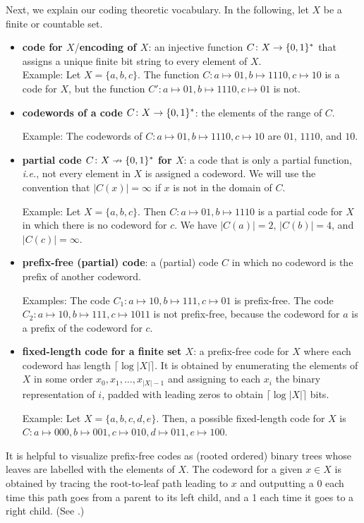 \documentclass[format=acmsmall, review=false, screen=true]{acmart}
\begin{document}
Next, we explain our coding theoretic vocabulary. In
the following, let $X$ be a finite or countable set.
\begin{itemize}
\item \textbf{code for $X$}/\textbf{encoding of $X$}: an 
injective function $C \colon X \to \{0, 1\}^*$ that
assigns a unique finite bit string to every element of $X$.\\
Example: Let $X = \{a,b,c\}$.
The function $C: a \mapsto 01, b \mapsto 1110, c \mapsto 10$ is
a code for $X$, but the function 
$C': a \mapsto 01, b \mapsto 1110, c \mapsto 01$ is not.
\item \textbf{codewords of a code $C\colon X \to \{0, 1\}^*$}:
the elements of the range of $C$.

Example: The codewords of
$C: a \mapsto 01, b \mapsto 1110, c \mapsto 10$ are
$01$, $1110$, and $10$.
\item \textbf{partial code $C\colon X\nrightarrow \{0,1\}^*$ for $X$}: a 
code that is only a partial function, \emph{i.e.}, not every element
in $X$ is assigned a codeword.
We will use the convention that
$|C(x)|=\infty$ if $x$ is not in the domain of $C$.

Example:
Let $X = \{a,b,c\}$.
Then $C: a \mapsto 01, b \mapsto 1110$ is
a partial code for $X$ in which there is no codeword for $c$.
We have $|C(a)| = 2$, $|C(b)| = 4$, and $|C(c)| = \infty$.
\item \textbf{prefix-free (partial) code}: a 
(partial) code $C$ in which no codeword is the prefix
of another codeword.

Examples: The code $C_1: a \mapsto 10, b\mapsto 111, c \mapsto 01$
is prefix-free. The code $C_2: a \mapsto 10, b\mapsto 111, c \mapsto 1011$
is not prefix-free, because the codeword for $a$ is a prefix
of the codeword for $c$.
\item \textbf{fixed-length code for a finite set $X$}: 
a prefix-free code for $X$ where each codeword has
length $\lceil\log |X|\rceil$.
It is obtained by enumerating
the elements of $X$ in some order $x_0,x_1,\ldots,x_{|X|-1}$ and
assigning to each $x_i$ the binary 
representation of $i$, padded with
leading zeros to obtain $\lceil\log |X|\rceil$ bits.

Example: Let $X = \{a,b,c,d,e\}$. Then, a possible
fixed-length code for $X$ is
$C: a \mapsto 000, b \mapsto 001, c \mapsto 010, d \mapsto 011,
e \mapsto 100$.
\end{itemize}

It is helpful to visualize prefix-free
codes as (rooted ordered) binary trees whose leaves are labelled with
the elements of $X$.  The codeword for a given
$x\in X$ is obtained by tracing the root-to-leaf path leading to $x$
and outputting a 0 each time this path goes from a parent to its left
child, and a 1 each time it goes to a right child. (See
.)
\end{document}
